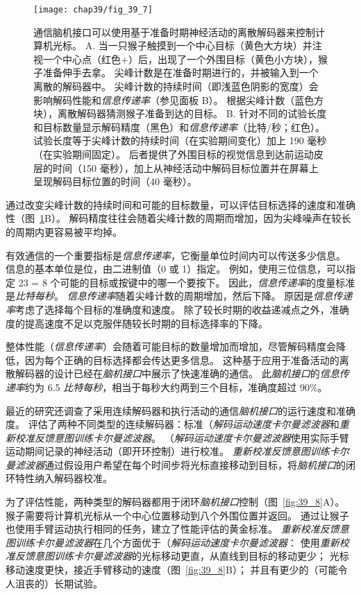 \begin{figure}[htbp]
	\centering
	\texttt{[image: chap39/fig\_39\_7]}
	\caption{通信脑机接口可以使用基于准备时期神经活动的离散解码器来控制计算机光标。 
		A. 当一只猴子触摸到一个中心目标（黄色大方块）并注视一个中心点（红色+）后，出现了一个外围目标（黄色小方块），猴子准备伸手去拿。 
		尖峰计数是在准备时期进行的，并被输入到一个离散的解码器中。 
		尖峰计数的持续时间（即浅蓝色阴影的宽度）会影响解码性能和\textit{信息传递率}（参见面板 B）。 
		根据尖峰计数（蓝色方块），离散解码器猜测猴子准备到达的目标。 
		B. 针对不同的试验长度和目标数量显示解码精度（黑色）和\textit{信息传递率}（比特/秒；红色）。 
		试验长度等于尖峰计数的持续时间（在实验期间变化）加上 190 毫秒（在实验期间固定）。 
		后者提供了外围目标的视觉信息到达前运动皮层的时间（150 毫秒），加上从神经活动中解码目标位置并在屏幕上呈现解码目标位置的时间（40 毫秒）\cite{santhanam2006high}。}
	\label{fig:39_7}
\end{figure}


通过改变尖峰计数的持续时间和可能的目标数量，可以评估目标选择的速度和准确性（图~\ref{fig:39_7}B）。
解码精度往往会随着尖峰计数的周期而增加，因为尖峰噪声在较长的周期内更容易被平均掉。


有效通信的一个重要指标是\textit{信息传递率}，它衡量单位时间内可以传送多少信息。
信息的基本单位是位，由二进制值（0 或 1）指定。
例如，使用三位信息，可以指定 23 = 8 个可能的目标或按键中的哪一个要按下。 
因此，\textit{信息传递率}的度量标准是\textit{比特每秒}。
\textit{信息传递率}随着尖峰计数的周期增加，然后下降。
原因是\textit{信息传递率}考虑了选择每个目标的准确度和速度。
除了较长时期的收益递减点之外，准确度的提高速度不足以克服伴随较长时期的目标选择率的下降。


整体性能（\textit{信息传递率}）会随着可能目标的数量增加而增加，尽管解码精度会降低，因为每个正确的目标选择都会传达更多信息。
这种基于应用于准备活动的离散解码器的设计已经在\textit{脑机接口}中展示了快速准确的通信。
此\textit{脑机接口}的\textit{信息传递率}约为 6.5 \textit{比特每秒}，相当于每秒大约两到三个目标，准确度超过 90\%。


最近的研究还调查了采用连续解码器和执行活动的通信\textit{脑机接口}的运行速度和准确度。
评估了两种不同类型的连续解码器：标准（\textit{解码运动速度卡尔曼滤波器}和\textit{重新校准反馈意图训练卡尔曼滤波器}。
（\textit{解码运动速度卡尔曼滤波器}使用实际手臂运动期间记录的神经活动（即开环控制）进行校准。
\textit{重新校准反馈意图训练卡尔曼滤波器}通过假设用户希望在每个时间步将光标直接移动到目标，将\textit{脑机接口}的闭环特性纳入解码器校准。


为了评估性能，两种类型的解码器都用于闭环\textit{脑机接口}控制（图~\ref{fig:39_8}A）。
猴子需要将计算机光标从一个中心位置移动到八个外围位置并返回。
通过让猴子也使用手臂运动执行相同的任务，建立了性能评估的黄金标准。
\textit{重新校准反馈意图训练卡尔曼滤波器}在几个方面优于（\textit{解码运动速度卡尔曼滤波器}：
使用\textit{重新校准反馈意图训练卡尔曼滤波器}的光标移动更直，从直线到目标的移动更少； 光标移动速度更快，接近手臂移动的速度（图~\ref{fig:39_8}B）； 并且有更少的（可能令人沮丧的）长期试验。



